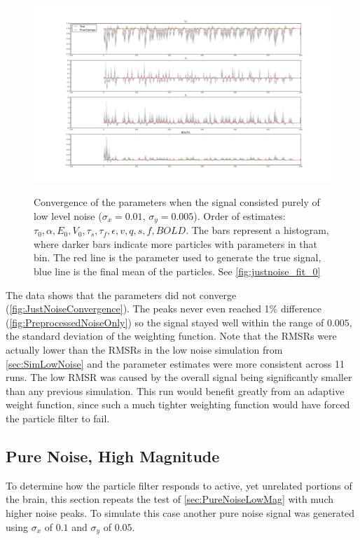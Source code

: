 \begin{figure}[H]
\centering
\subfigure
{\includegraphics[clip=true,trim=7cm 3cm 6cm 3cm, width=\textwidth]{images/justnoise_hist_3}}
\caption[Convergence of the parameters when the signal consisted purely of low level noise 
($\sigma_x = 0.01$, $\sigma_y = 0.005$).]
{Convergence of the parameters when the signal consisted purely of low level noise 
($\sigma_x = 0.01$, $\sigma_y = 0.005$).
Order of estimates: $\tau_0, \alpha, E_0, V_0, \tau_s, \tau_f, \epsilon, v,
q, s, f, BOLD$.  The bars represent
a histogram, where darker bars indicate more particles with parameters in that bin. The red 
line is the parameter used to generate the true signal, blue line is the final mean of the
particles. See \autoref{fig:justnoise_fit_0}}
\label{fig:JustNoiseConvergence}
\end{figure}

The data shows that the parameters did not converge
(\autoref{fig:JustNoiseConvergence}).
The peaks never even reached 1\% difference
(\autoref{fig:PreprocessedNoiseOnly}) so  the signal  stayed
well within the range of $0.005$, the standard deviation of the weighting function.
Note that the \acp{RMSR}
were actually lower than the \acp{RMSR} in the low noise simulation 
from \autoref{sec:SimLowNoise}
and the parameter estimates were more consistent across 11 runs.
The low \ac{RMSR} was caused by the overall
signal being significantly smaller than any previous simulation.
This run would benefit greatly from an adaptive weight function, since
such a much tighter weighting function would have forced the particle
filter to fail.

\subsection{Pure Noise, High Magnitude}
\label{sec:PureNoiseHighMag}
To determine how the particle filter responds to active, yet unrelated
portions of the brain, this section repeats the test of \autoref{sec:PureNoiseLowMag}
with much higher noise peaks. To simulate this case another
pure noise signal was generated using $\sigma_x$ of $0.1$ and $\sigma_y$ of $0.05$.

